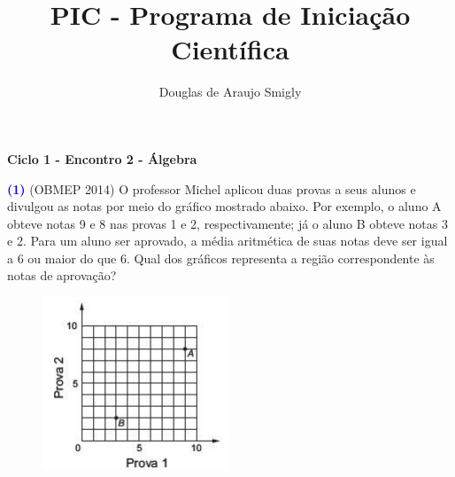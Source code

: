 \documentclass[12pt, a4paper]{article}
\title{PIC - Programa de Iniciação Científica}
\author{Douglas de Araujo Smigly}
\date{}
\begin{document}
\maketitle
\begin{center}
\large\textbf{\textcolor{Floresta}{Ciclo 1 - Encontro 2 - Álgebra}}\\
\end{center}
\textcolor{blue}{\bf(1)} (OBMEP 2014) O professor Michel aplicou duas provas a seus alunos e divulgou as notas por meio do gráfico mostrado abaixo. Por exemplo, o aluno A obteve notas 9 e 8 nas provas 1 e 2, respectivamente; já o aluno B obteve notas 3 e 2. Para um aluno ser aprovado, a média aritmética de suas notas deve ser igual a 6 ou maior do que 6. Qual dos gráficos representa a região correspondente às notas de aprovação?
\begin{figure}[!h]
    \centering
    \includegraphics[scale=1.2]{Figuras/1enc2ciclo1.png}
\end{figure}
\end{document}
